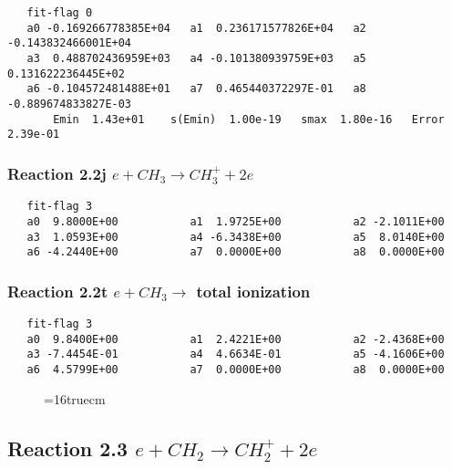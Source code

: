 \documentclass[12pt]{article}
\begin{document}
\begin{small}\begin{verbatim} 
   fit-flag 0
   a0 -0.169266778385E+04   a1  0.236171577826E+04   a2 -0.143832466001E+04
   a3  0.488702436959E+03   a4 -0.101380939759E+03   a5  0.131622236445E+02
   a6 -0.104572481488E+01   a7  0.465440372297E-01   a8 -0.889674833827E-03
       Emin  1.43e+01    s(Emin)  1.00e-19   smax  1.80e-16   Error  2.39e-01
\end{verbatim}\end{small}

 
\subsubsection{
Reaction 2.2j  $e + CH_{3} \rightarrow CH_{3}^{+} +2e $
}
 
\begin{small}\begin{verbatim} 
   fit-flag 3
   a0  9.8000E+00           a1  1.9725E+00           a2 -2.1011E+00 
   a3  1.0593E+00           a4 -6.3438E+00           a5  8.0140E+00 
   a6 -4.2440E+00           a7  0.0000E+00           a8  0.0000E+00
\end{verbatim}\end{small}

 
\subsubsection{
Reaction 2.2t  $e + CH_{3} \rightarrow$ total ionization 
}
 
\begin{small}\begin{verbatim} 
   fit-flag 3
   a0  9.8400E+00           a1  2.4221E+00           a2 -2.4368E+00 
   a3 -7.4454E-01           a4  4.6634E-01           a5 -4.1606E+00 
   a6  4.5799E+00           a7  0.0000E+00           a8  0.0000E+00
\end{verbatim}\end{small}

\begin{figure} \label{met.1_2.1}
\epsfxsize=16truecm
\end{figure}
\newpage
 
\subsection{
Reaction 2.3      $e + CH_2 \rightarrow  CH_2^+ + 2e$
}
 
\end{document}
